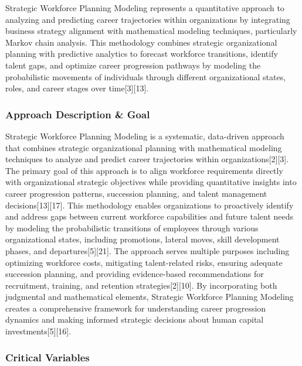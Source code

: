 \documentclass[main.tex]{subfiles}
\begin{document}
Strategic Workforce Planning Modeling represents a quantitative approach to analyzing and predicting career trajectories within organizations by integrating business strategy alignment with mathematical modeling techniques, particularly Markov chain analysis. This methodology combines strategic organizational planning with predictive analytics to forecast workforce transitions, identify talent gaps, and optimize career progression pathways by modeling the probabilistic movements of individuals through different organizational states, roles, and career stages over time[3][13].

\subsubsection{Approach Description \& Goal}

Strategic Workforce Planning Modeling is a systematic, data-driven approach that combines strategic organizational planning with mathematical modeling techniques to analyze and predict career trajectories within organizations[2][3]. The primary goal of this approach is to align workforce requirements directly with organizational strategic objectives while providing quantitative insights into career progression patterns, succession planning, and talent management decisions[13][17]. This methodology enables organizations to proactively identify and address gaps between current workforce capabilities and future talent needs by modeling the probabilistic transitions of employees through various organizational states, including promotions, lateral moves, skill development phases, and departures[5][21]. The approach serves multiple purposes including optimizing workforce costs, mitigating talent-related risks, ensuring adequate succession planning, and providing evidence-based recommendations for recruitment, training, and retention strategies[2][10]. By incorporating both judgmental and mathematical elements, Strategic Workforce Planning Modeling creates a comprehensive framework for understanding career progression dynamics and making informed strategic decisions about human capital investments[5][16].

\subsubsection{Critical Variables}
\end{document}
